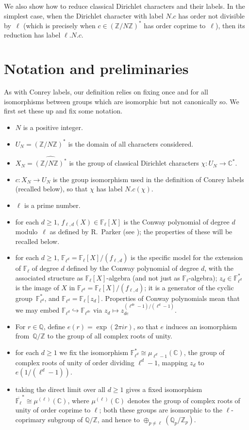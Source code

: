 \documentclass[a4paper, 10pt]{amsart}
\def\Z{{\mathbb Z}}
\def\Q{{\mathbb Q}}
\def\C{{\mathbb C}}
\def\F{{\mathbb F}}
\def\Fl{{\mathbb F}_{\ell}}
\def\Fld{{\mathbb F}_{\ell^d}}
\def\Flbar{\overline{{\mathbb F}_{\ell}}}
\def\ZNs{(\Z/N\Z)^*}
\def\ZNsh{\widehat{\ZNs}}
\newcommand{\CLab}[2]{$#1.#2$}
\newcommand{\DLab}[3]{$#1.#2.#3$}   %
\begin{document}
We also show how to reduce classical Dirichlet characters and their
labels.  In the simplest case, when the Dirichlet character with label
\CLab{N}{c} has order not divisible by~$\ell$ (which is precisely
when $c\in\ZNs$ has order coprime to~$\ell$), then its reduction
has label \DLab{\ell}{N}{c}.

\section{Notation and preliminaries}

As with Conrey labels, our definition relies on fixing once and for
all isomorphisms between groups which are isomorphic but not
canonically so.  We first set these up and fix some notation.

\begin{itemize}
\item $N$ is a positive integer.
\item $U_N=\ZNs$ is the domain of all characters considered.
\item $X_N=\ZNsh$ is the group of classical Dirichlet characters
  $\chi:U_N\to\C^*$.
\item $c:X_N\to U_N$ is the group isomorphism used in the
  definition of Conrey labels (recalled below), so that $\chi$ has
  label \CLab{N}{c(\chi)}.
\item $\ell$ is a prime number.
\item for each $d\ge1$, $f_{\ell,d}(X) \in \Fl[X]$ is the Conway
  polynomial of degree $d$ modulo~$\ell$ as defined by R.~Parker (see
  \cite{ConwayPol}); the properties of these will be recalled below.
\item for each $d\ge1$, $\Fld=\Fl[X]/(f_{\ell,d})$ is the specific
  model for the extension of $\Fl$ of degree $d$ defined by the Conway
  polynomial of degree $d$, with the associated structure as
  $\Fl[X]$-algebra (and not just as $\Fl$-algebra); $z_d\in\Fld^*$ is
  the image of $X$ in $\Fld=\Fl[X]/(f_{\ell,d})$; it is a generator of
  the cyclic group~$\Fld^*$, and $\Fld=\Fl[z_d]$.  Properties of
  Conway polynomials mean that we may embed
  $\Fld\hookrightarrow\F_{\ell^{de}}$ via $z_d\mapsto
  z_{de}^{(\ell^{de}-1)/(\ell^d-1)}$.
\item For $r\in\Q$, define $e(r)=\exp(2\pi ir)$, so that $e$ induces an
  isomorphism from~$\Q/\Z$ to the group of all complex roots of unity.
\item for each $d\ge1$ we fix the isomorphism
  $\Fld^*\cong\mu_{\ell^d-1}(\C)$, the group of complex roots of unity
  of order dividing $\ell^d-1$, mapping $z_d$ to $e(1/(\ell^d-1))$.
\item taking the direct limit over all $d\ge1$ gives a fixed
  isomorphism $\Flbar^*\cong\mu^{(\ell)}(\C)$, where
  $\mu^{(\ell)}(\C)$ denotes the group of complex roots of unity of
  order coprime to $\ell$; both these groups are isomorphic to the
  $\ell$-coprimary subgroup of $\Q/\Z$, and hence to
  $\oplus_{p\not=\ell}(\Q_p/\Z_p)$.
\end{itemize}
\end{document}
